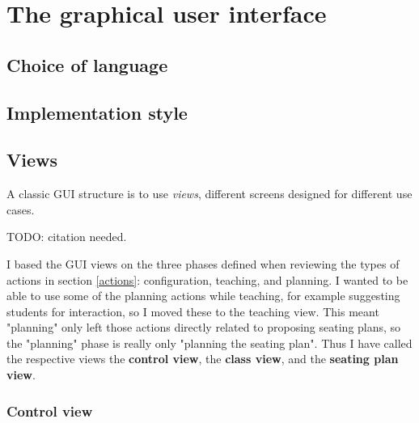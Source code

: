 \documentclass[10pt]{article}
\begin{document}
\section{The graphical user interface} \label{gui}

\subsection{Choice of language}

\subsection{Implementation style}

\subsection{Views}
A classic GUI structure is to use \emph{views}, different screens designed for different use cases.
 
TODO: citation needed.

I based the GUI views on the three phases defined when reviewing the types of actions in section \ref{actions}: configuration, teaching, and planning. I wanted to be able to use some of the planning actions while teaching, for example suggesting students for interaction, so I moved these to the teaching view. This meant "planning" only left those actions directly related to proposing seating plans, so the "planning" phase is really only "planning the seating plan". Thus I have called the respective views the \textbf{control view}, the \textbf{class view}, and the \textbf{seating plan view}.

\subsubsection{Control view}
\end{document}
